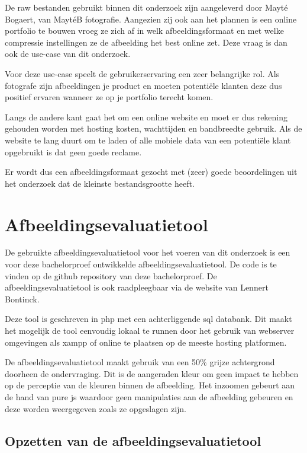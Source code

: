 De \gls{raw} bestanden gebruikt binnen dit onderzoek zijn aangeleverd door Mayté Bogaert, van MaytéB fotografie. Aangezien zij ook aan het plannen is een online portfolio te bouwen vroeg ze zich af in welk \gls{afbeeldingsformaat} en met welke compressie instellingen ze de afbeelding het best online zet. Deze vraag is dan ook de \gls{use-case} van dit onderzoek.

Voor deze \gls{use-case} speelt de gebruikerservaring een zeer belangrijke rol. Als fotografe zijn afbeeldingen je product en moeten potentiële klanten deze dus positief ervaren wanneer ze op je portfolio terecht komen.

Langs de andere kant gaat het om een online website en moet er dus rekening gehouden worden met \gls{hosting} kosten, wachttijden en \gls{bandbreedte} gebruik. Als de website te lang duurt om te laden of alle mobiele data van een potentiële klant opgebruikt is dat geen goede reclame.

Er wordt dus een \gls{afbeeldingsformaat} gezocht met (zeer) goede beoordelingen uit het onderzoek dat de kleinste bestandsgrootte heeft.

\section{Afbeeldingsevaluatietool}
\label{sec:onderzoek-evaluatietool}

De gebruikte \gls{afbeeldingsevaluatietool} voor het voeren van dit onderzoek is een voor deze bachelorproef ontwikkelde \gls{afbeeldingsevaluatietool}. De code is te vinden op de \gls{github} repository van deze bachelorproef. De \gls{afbeeldingsevaluatietool} is ook raadpleegbaar via de website van Lennert Bontinck.

Deze tool is geschreven in \gls{php} met een achterliggende \gls{sql} databank. Dit maakt het mogelijk de tool eenvoudig lokaal te runnen door het gebruik van webserver omgevingen als \gls{xampp} of online te plaatsen op de meeste \gls{hosting} platformen.

De \gls{afbeeldingsevaluatietool} maakt gebruik van een 50\% grijze achtergrond doorheen de ondervraging. Dit is de aangeraden kleur om geen impact te hebben op de perceptie van de kleuren binnen de afbeelding. Het inzoomen gebeurt aan de hand van pure \gls{js} waardoor geen manipulaties aan de afbeelding gebeuren en deze worden weergegeven zoals ze opgeslagen zijn. 

\subsection{Opzetten van de afbeeldingsevaluatietool}
\label{sec:onderzoek-evaluatietool-setup}

